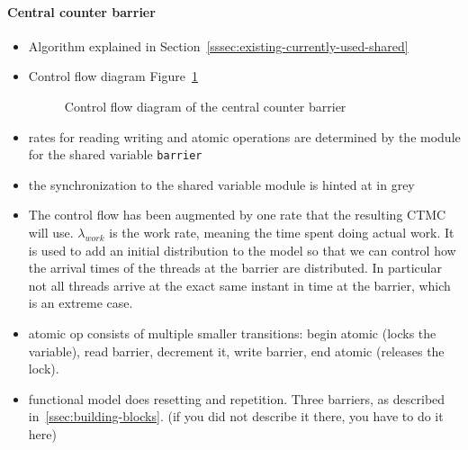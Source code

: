 \documentclass[a4paper, 10pt]{article}
\begin{document}
\begin{enumerate}
\paragraph{Central counter barrier}
\label{sssec:analysis-modelchecking-modelling-central-counter}
\begin{itemize}
	\item Algorithm explained in Section~\ref{sssec:existing-currently-used-shared}
	\item Control flow diagram Figure~\ref{fig:central-counter-control-flow}
		\begin{figure}[htbp]
			\centering
			
			\caption{Control flow diagram of the central counter barrier}
			\label{fig:central-counter-control-flow}
		\end{figure}
	\item rates for reading writing and atomic operations are determined by the module for the shared variable \texttt{barrier}
	\item the synchronization to the shared variable module is hinted at in grey
	\item The control flow has been augmented by one rate that the resulting CTMC will use. $\lambda_{work}$ is the work rate, meaning the time spent doing actual work. It is used to add an initial distribution to the model so that we can control how the arrival times of the threads at the barrier are distributed. In particular not all threads arrive at the exact same instant in time at the barrier, which is an extreme case.
	\item atomic op consists of multiple smaller transitions: begin atomic (locks the variable), read barrier, decrement it, write barrier, end atomic (releases the lock).
	\item functional model does resetting and repetition. Three barriers, as described in~\ref{ssec:building-blocks}. (if you did not describe it there, you have to do it here)
\end{itemize}


\end{enumerate}
\end{document}
